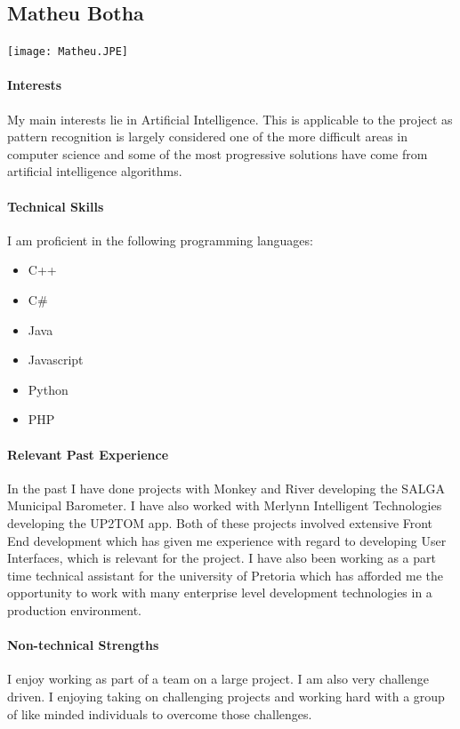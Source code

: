 \documentclass[12pt]{article}
\begin{document}
\subsection{Matheu Botha}
\texttt{[image: Matheu.JPE]}
\paragraph{Interests}
My main interests lie in Artificial Intelligence. This is applicable to the project as pattern recognition is largely considered one of the more difficult areas in computer science and some of the most progressive solutions have come from artificial intelligence algorithms.
\paragraph{Technical Skills}
	I am proficient in the following programming languages:
	\begin{itemize}
		\item C++
		\item C\#
		\item Java
		\item Javascript
		\item Python
		\item PHP
	\end{itemize}

\paragraph{Relevant Past Experience}
	In the past I have done projects with Monkey and River developing the SALGA Municipal Barometer. I have also worked with Merlynn Intelligent Technologies developing the UP2TOM app. Both of these projects involved extensive Front End development which has given me experience with regard to developing User Interfaces, which is relevant for the project. I have also been working as a part time technical assistant for the university of Pretoria which has afforded me the opportunity to work with many enterprise level development technologies in a production environment.

\paragraph{Non-technical Strengths} 
	I enjoy working as part of a team on a large project. I am also very challenge driven. I enjoying taking on challenging projects and working hard with a group of like minded individuals to overcome those challenges.
\end{document}
